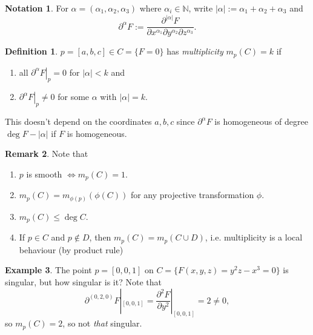 \documentclass{article}
\newcommand{\N}{\mathbb{N}}
\theoremstyle{definition}
\newtheorem{defn}{Definition}[subsection]
\newtheorem{example}[defn]{Example}
\newtheorem{remark}[defn]{Remark}
\newtheorem*{notation}{Notation}
\begin{document}
\begin{notation}
For $\alpha=(\alpha_1,\alpha_2,\alpha_3)$ where $\alpha_i\in\N$, write $|\alpha|:=\alpha_1+\alpha_2+\alpha_3$ and
\[
\partial^\alpha F:=\frac{\partial^{|\alpha|}F}{\partial x^{\alpha_1}\partial y^{\alpha_2}\partial z^{\alpha_3}}.
\]
\end{notation}
\begin{defn}
$p=[a,b,c]\in C=\{F=0\}$ has \textit{multiplicity} $m_p(C)=k$ if
\begin{enumerate}
\item all $\left.\partial^\alpha F\right|_p=0$ for $|\alpha|<k$ and
\item $\left.\partial^\alpha F\right|_p\neq 0$ for some $\alpha$ with $|\alpha|=k$.
\end{enumerate}
\end{defn}
This doesn't depend on the coordinates $a,b,c$ since $\partial^\alpha F$ is homogeneous of degree $\deg F-|\alpha|$ if $F$ is homogeneous.

\begin{remark}
Note that
\begin{enumerate}
\item $p$ is smooth $\iff m_p(C)=1$.
\item $m_p(C)=m_{\phi(p)}(\phi(C))$ for any projective transformation $\phi$.
\item $m_p(C)\leq \deg C$.
\item If $p\in C$ and $p\notin D$, then $m_p(C)=m_p(C\cup D)$, i.e. multiplicity is a local behaviour (by product rule)
\end{enumerate}
\end{remark}

\begin{example}
The point $p=[0,0,1]$ on $C=\{F(x,y,z)=y^2z-x^3=0\}$ is singular, but how singular is it? Note that
\[
\partial^{(0,2,0)}F|_{[0,0,1]}=\frac{\partial^2F}{\partial y^2}|_{[0,0,1]}=2\neq 0,
\]
so $m_p(C)=2$, so not \textit{that} singular.
\end{example}
\end{document}
